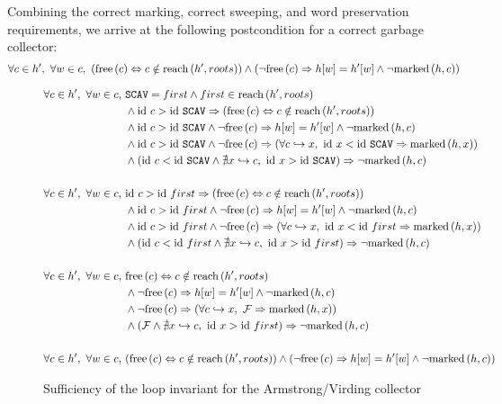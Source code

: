 Combining the correct marking, correct sweeping, and word preservation
requirements, we arrive at the following postcondition for a correct
garbage collector: \[\forall c \in h',\ \forall w \in c,\
(\mathrm{free}\left(c\right) \Leftrightarrow c \notin \mathrm{reach}\left(h', roots\right)) \land (\lnot\mathrm{free}\left(c\right) \Rightarrow
h[w] = h'[w] \land \lnot\mathrm{marked}\left(h, c\right))\]

\begin{lemma}
  \begin{figure}[t]
    \centering
    \begin{align*}
      \forall c \in h',\ \forall w \in c,\ &\mathtt{SCAV} = first \land
        first \in \reach{h'}{roots}\\
%
      &\land \id~c > \id~\mathtt{SCAV} \implies (\free{c}
        \iff c \notin \reach{h'}{roots})\\
%
      &\land \id~c > \id~\mathtt{SCAV} \land \lnot\free{c}
        \implies h[w] = h'[w] \land \lnot \marked{h}{c}\\
%
      &\land \id~c > \id~\mathtt{SCAV} \land \lnot\free{c}
        \implies (\forall c \pointsto x,\ \id~x < \id~\mathtt{SCAV}
        \implies \marked{h}{x})\\
%
      &\land \left(\id~c < \id~\mathtt{SCAV} \land \nexists x \pointsto
        c,\ \id~x > \id~\mathtt{SCAV}\right) \implies
        \lnot\marked{h}{c}\\\\
%
%
      \forall c \in h',\ \forall w \in c,\ & \id~c > \id~first \implies
        (\free{c} \iff c \notin \reach{h'}{roots})\\
%
      &\land \id~c > \id~first \land \lnot\free{c}
        \implies h[w] = h'[w] \land \lnot \marked{h}{c}\\
%
      &\land \id~c > \id~first \land \lnot\free{c}
        \implies (\forall c \pointsto x,\ \id~x < \id~first
        \implies \marked{h}{x})\\
%
      &\land \left(\id~c < \id~first \land \nexists x \pointsto
        c,\ \id~x > \id~first\right) \implies
        \lnot\marked{h}{c}\\\\
%
%
      \forall c \in h',\ \forall w \in c,\ & \free{c} \iff c \notin
        \reach{h'}{roots}\\
%
      &\land \lnot\free{c} \implies h[w] = h'[w] \land \lnot \marked{h}{c}\\
%
      &\land \lnot\free{c} \implies (\forall c \pointsto x,\
        \lfalse \implies \marked{h}{x})\\
%
      &\land \left(\lfalse \land \nexists x \pointsto
        c,\ \id~x > \id~first\right) \implies
        \lnot\marked{h}{c}\\\\
%
%
      \forall c \in h',\ \forall w \in c,\ & (\free{c} \iff c \notin
        \reach{h'}{roots}) \land (\lnot\free{c} \implies h[w] = h'[w] \land
        \lnot \marked{h}{c})
    \end{align*}
    \caption{Sufficiency of the loop invariant for the Armstrong/Virding collector}
    \label{fig:marksweep-example-partial-sufficient}
  \end{figure}


\end{lemma}

